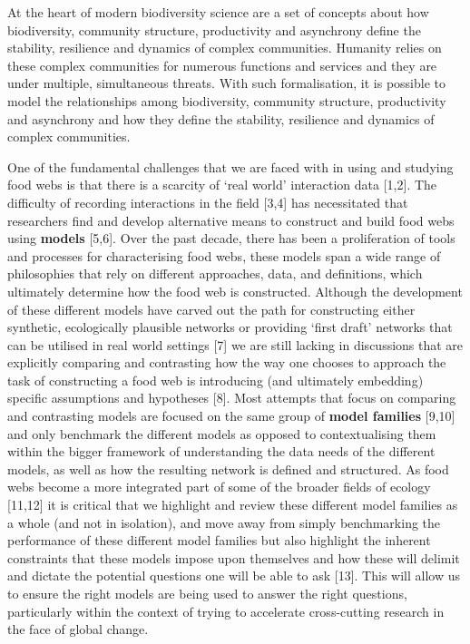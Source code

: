 \documentclass[
]{article}
\begin{document}
At the heart of modern biodiversity science are a set of concepts about
how biodiversity, community structure, productivity and asynchrony
define the stability, resilience and dynamics of complex communities.
Humanity relies on these complex communities for numerous functions and
services and they are under multiple, simultaneous threats. With such
formalisation, it is possible to model the relationships among
biodiversity, community structure, productivity and asynchrony and how
they define the stability, resilience and dynamics of complex
communities.

One of the fundamental challenges that we are faced with in using and
studying food webs is that there is a scarcity of `real world'
interaction data {[}1,2{]}. The difficulty of recording interactions in
the field {[}3,4{]} has necessitated that researchers find and develop
alternative means to construct and build food webs using \textbf{models}
{[}5,6{]}. Over the past decade, there has been a proliferation of tools
and processes for characterising food webs, these models span a wide
range of philosophies that rely on different approaches, data, and
definitions, which ultimately determine how the food web is constructed.
Although the development of these different models have carved out the
path for constructing either synthetic, ecologically plausible networks
or providing `first draft' networks that can be utilised in real world
settings {[}7{]} we are still lacking in discussions that are explicitly
comparing and contrasting how the way one chooses to approach the task
of constructing a food web is introducing (and ultimately embedding)
specific assumptions and hypotheses {[}8{]}. Most attempts that focus on
comparing and contrasting models are focused on the same group of
\textbf{model families} {[}9,10{]} and only benchmark the different
models as opposed to contextualising them within the bigger framework of
understanding the data needs of the different models, as well as how the
resulting network is defined and structured. As food webs become a more
integrated part of some of the broader fields of ecology {[}11,12{]} it
is critical that we highlight and review these different model families
as a whole (and not in isolation), and move away from simply
benchmarking the performance of these different model families but also
highlight the inherent constraints that these models impose upon
themselves and how these will delimit and dictate the potential
questions one will be able to ask {[}13{]}. This will allow us to ensure
the right models are being used to answer the right questions,
particularly within the context of trying to accelerate cross-cutting
research in the face of global change.
\end{document}
